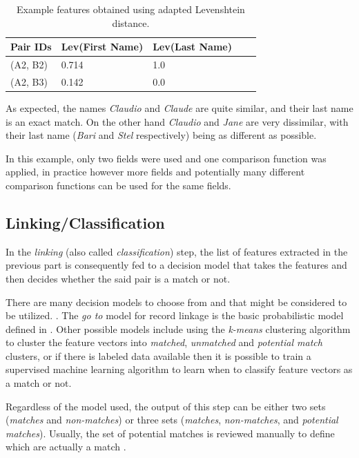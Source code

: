 \documentclass[epsfig,a4paper,11pt,titlepage,twoside,openany]{book}
\begin{document}
\begin{table}[H]
  \centering
  \begin{tabular}{l|l|l|l|l}
    Pair IDs & Lev(First Name) & Lev(Last Name) \\ \hline
    (A2, B2) & 0.714           & 1.0            \\
    (A2, B3) & 0.142           & 0.0           
  \end{tabular}
  \caption{Example features obtained using adapted Levenshtein distance.}
  \label{tab:ex-feature-levens}
\end{table}

As expected, the names \textit{Claudio} and \textit{Claude} are quite similar,
and their last name is an exact match. On the other hand \textit{Claudio} and
\textit{Jane} are very dissimilar, with their last name (\textit{Bari} and
\textit{Stel} respectively) being as different as possible.

In this example, only two fields were used and one comparison function was applied, in practice
however more fields and potentially many different comparison
functions can be used for the same fields.


\subsection{Linking/Classification}
\label{sec:rl-workflow-linking}

In the \textit{linking} (also called \textit{classification}) step, the list of features extracted in the previous part is consequently fed to a decision model that takes the features and then decides whether the said pair is a match or not.

There are many decision models to choose from and that might be considered to be utilized. \cite{gu06_decis_model_recor_linkag}.
The \textit{go to} model for record linkage is the basic probabilistic model defined in
\cite{fellegi69_theor_recor_linkag}. Other possible models \cite{Elfeky_tailor} include using the \textit{k-means} \cite{Hartigan1979} clustering algorithm to cluster the feature vectors into \textit{matched}, \textit{unmatched} and \textit{potential match} clusters, or if there is labeled data available then it is possible to train a supervised machine learning algorithm to learn when to classify
feature vectors as a match or not.

Regardless of the model used, the output of this step can be either two sets (\textit{matches} and \textit{non-matches}) or three sets (\textit{matches}, \textit{non-matches}, and \textit{potential matches}). Usually, the set of potential matches is reviewed manually to define which are actually a match \cite{dusetzina_m_2014}.
\end{document}
